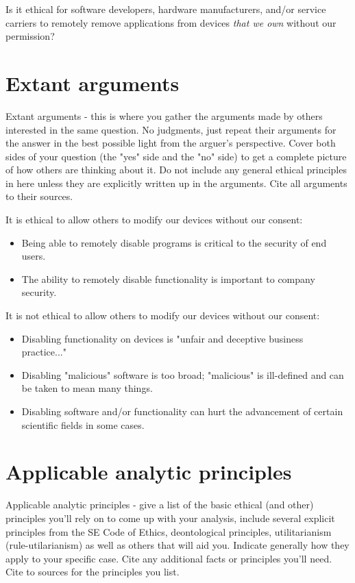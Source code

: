 \documentclass[12pt]{article}
\begin{document}
Is it ethical for software developers, hardware manufacturers, and/or service carriers to remotely remove applications from devices \emph{that we own} without our permission?

\section{Extant arguments}
Extant arguments - this is where you gather the arguments made by others interested in the same question. No judgments, just repeat their arguments for the answer in the best possible light from the arguer's perspective. Cover both sides of your question (the "yes" side and the "no" side) to get a complete picture of how others are thinking about it. Do not include any general ethical principles in here unless they are explicitly written up in the arguments. Cite all arguments to their sources. \cite{handout}

It is ethical to allow others to modify our devices without our consent:
\begin{itemize}
\item Being able to remotely disable programs is critical to the security of end users. \cite{AndroidBlog} \cite{iPhoneKill}
\item The ability to remotely disable functionality is important to company security. \cite{sonySupercomputer}
\end{itemize}
It is not ethical to allow others to modify our devices without our consent:
\begin{itemize}
\item Disabling functionality on devices is "unfair and deceptive business practice..." \cite{sonyLawsuit2}
\item Disabling "malicious" software is too broad; "malicious" is ill-defined and can be taken to mean many things. \cite{iPhoneKill}
\item Disabling software and/or functionality can hurt the advancement of certain scientific fields in some cases. \cite{sonySupercomputer}
\end{itemize}

\section{Applicable analytic principles}
Applicable analytic principles - give a list of the basic ethical (and other) principles you'll rely on to come up with your analysis, include several explicit principles from the SE Code of Ethics, deontological principles, utilitarianism (rule-utilarianism) as well as others that will aid you. Indicate generally how they apply to your specific case. Cite any additional facts or principles you'll need. Cite to sources for the principles you list. \cite{handout}  
\end{document}
